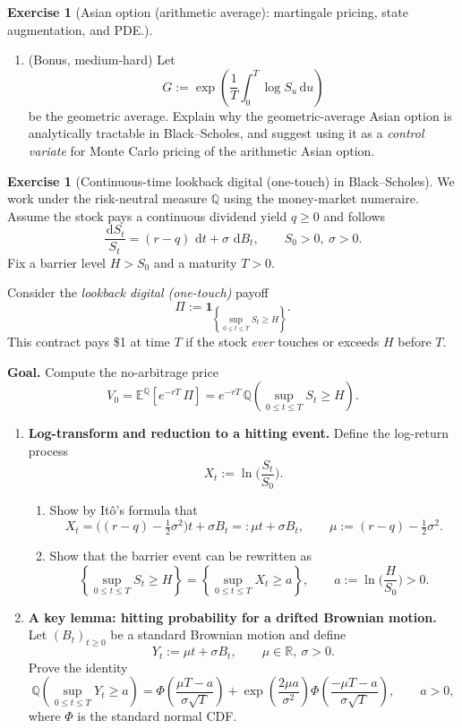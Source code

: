 \documentclass[11pt]{article}
\newcommand{\R}{\mathbb{R}}
\newcommand{\E}{\mathbb{E}}
\newcommand{\dd}{\,\mathrm{d}}
\theoremstyle{plain}
\theoremstyle{definition}
\newtheorem{exercise}[theorem]{Exercise}
\theoremstyle{remark}
\begin{document}
\begin{exercise}[Asian option (arithmetic average): martingale pricing, state augmentation, and PDE.]
\begin{enumerate}[leftmargin=1.2em, label=(\alph*), itemsep=0.3em]
\item (Bonus, medium-hard) Let
\[
G:=\exp\!\left(\frac1T\int_0^T \log S_u\,\mathrm{d}u\right)
\]
be the geometric average. Explain why the geometric-average Asian option is analytically tractable in Black--Scholes, and suggest using it as a \emph{control variate} for Monte Carlo pricing of the arithmetic Asian option.
\end{enumerate}
\end{exercise}

\begin{exercise}[Continuous-time lookback digital (one-touch) in Black--Scholes]
We work under the risk-neutral measure $\mathbb{Q}$ using the money-market numeraire.
Assume the stock pays a continuous dividend yield $q\ge 0$ and follows
\[
\frac{\dd S_t}{S_t}=(r-q)\,\dd t+\sigma\,\dd B_t,
\qquad S_0>0,\ \sigma>0.
\]
Fix a barrier level $H>S_0$ and a maturity $T>0$.

Consider the \emph{lookback digital (one-touch)} payoff
\[
\Pi := \mathbf 1_{\left\{\sup_{0\le t\le T} S_t \ge H\right\}}.
\]
This contract pays \$1 at time $T$ if the stock \emph{ever} touches or exceeds $H$ before $T$.

\medskip
\noindent\textbf{Goal.} Compute the no-arbitrage price
\[
V_0 = \E^{\mathbb{Q}}\!\left[e^{-rT}\,\Pi\right]
= e^{-rT}\,\mathbb{Q}\!\left(\sup_{0\le t\le T} S_t \ge H\right).
\]

\begin{enumerate}[leftmargin=1.6em, itemsep=0.35em]

\item \textbf{Log-transform and reduction to a hitting event.}
Define the log-return process
\[
X_t := \ln\!\Big(\frac{S_t}{S_0}\Big).
\]
\begin{enumerate}[leftmargin=1.6em, itemsep=0.25em]
\item Show by It\^o's formula that
\[
X_t = \Big((r-q)-\tfrac12\sigma^2\Big)t + \sigma B_t
=: \mu t + \sigma B_t,
\qquad \mu:=(r-q)-\tfrac12\sigma^2.
\]
\item Show that the barrier event can be rewritten as
\[
\left\{\sup_{0\le t\le T} S_t \ge H\right\}
=
\left\{\sup_{0\le t\le T} X_t \ge a\right\},
\qquad
a:=\ln\!\Big(\frac{H}{S_0}\Big)>0.
\]
\end{enumerate}

\item \textbf{A key lemma: hitting probability for a drifted Brownian motion.}
Let $(B_t)_{t\ge0}$ be a standard Brownian motion and define
\[
Y_t := \mu t + \sigma B_t,
\qquad \mu\in\R,\ \sigma>0.
\]
Prove the identity
\begin{equation}\label{eq:hitting-drifted}
\mathbb{Q}\!\left(\sup_{0\le t\le T} Y_t \ge a\right)
=
\Phi\!\left(\frac{\mu T-a}{\sigma\sqrt{T}}\right)
+
\exp\!\left(\frac{2\mu a}{\sigma^2}\right)
\Phi\!\left(\frac{-\mu T-a}{\sigma\sqrt{T}}\right),
\qquad a>0,
\end{equation}
where $\Phi$ is the standard normal CDF.


\end{enumerate}
\end{exercise}
\end{document}
